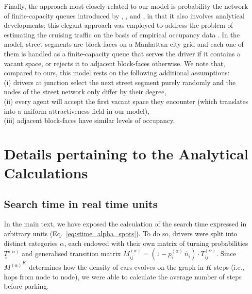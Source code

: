 \documentclass[trsc,reprint]{informs3}
\newcommand{\uul}[1]{\underline{\underline{#1}}}
\newcommand{\alp}{^{(\alpha)}}
\begin{document}
\begin{APPENDICES}
{Finally, the approach most closely related to our model is probability the network of finite-capacity queues introduced by \citet{ratliff2016observe}, \citet{dowling2019modeling}, and \citet{tavafoghi2019queuing}, in that
it also involves analytical developments; this elegant approach was employed to address the problem
of estimating the cruising traffic on the basis of empirical occupancy data \citep{dowling2019modeling}. In the model, 
street segments are block-faces on a Manhattan-city grid and each one of them is handled
as a finite-capacity queue that serves the driver if it contains a vacant space, or rejects it 
to adjacent block-faces otherwise. We note
that, compared to ours, this model rests on the following additional assumptions: \\
(i) drivers at junction select the next street segment purely randomly and the nodes of the street network only differ by their degree,\\
(ii) every agent will accept the first vacant space they encounter (which translates into a uniform attractiveness field in our model), \\
(iii)  adjacent block-faces have similar levels of occupancy. 
}








\section{Details pertaining to the Analytical Calculations}


\subsection{Search time in real time units \label{sec:Appendix_searchtime_real}}

In the main text, we have exposed the calculation of the search time expressed in arbitrary units (Eq.~\ref{eq:stime_alpha_spots}). To do so, drivers were split into distinct categories $\alpha$, each endowed with their own matrix of turning probabilities ${\uul{T}}\alp$ and generalised transition matrix $M\alp_{ij}= (1-p_i\alp\,\hat{n}_i)\cdot T_{ij}\alp$. Since ${M\alp}^K$ determines how the density of cars evolves on the graph in $K$ steps (i.e., hops from node to node), we were able to calculate the average number of steps before parking.



\end{APPENDICES}
\end{document}
